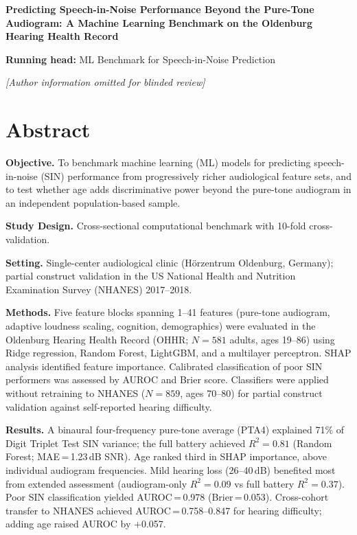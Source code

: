 \documentclass[12pt,a4paper]{article}
\begin{document}
\begin{center}
{\large\textbf{Predicting Speech-in-Noise Performance Beyond the Pure-Tone
Audiogram: A Machine Learning Benchmark on the Oldenburg Hearing Health
Record}}
\end{center}

\medskip
\noindent\textbf{Running head:} ML Benchmark for Speech-in-Noise Prediction

\medskip
\noindent\textit{[Author information omitted for blinded review]}

\section*{Abstract}

\noindent\textbf{Objective.} To benchmark machine learning (ML) models for
predicting speech-in-noise (SIN) performance from progressively richer
audiological feature sets, and to test whether age adds discriminative power
beyond the pure-tone audiogram in an independent population-based sample.

\noindent\textbf{Study Design.} Cross-sectional computational benchmark with
10-fold cross-validation.

\noindent\textbf{Setting.} Single-center audiological clinic (Hörzentrum
Oldenburg, Germany); partial construct validation in the US National Health
and Nutrition Examination Survey (NHANES) 2017--2018.

\noindent\textbf{Methods.} Five feature blocks spanning 1--41 features
(pure-tone audiogram, adaptive loudness scaling, cognition, demographics)
were evaluated in the Oldenburg Hearing Health Record (OHHR; $N=581$ adults,
ages 19--86) using Ridge regression, Random Forest, LightGBM, and a
multilayer perceptron. SHAP analysis identified feature importance. Calibrated
classification of poor SIN performers was assessed by AUROC and Brier score.
Classifiers were applied without retraining to NHANES ($N=859$, ages 70--80)
for partial construct validation against self-reported hearing difficulty.

\noindent\textbf{Results.} A binaural four-frequency pure-tone average (PTA4)
explained 71\% of Digit Triplet Test SIN variance; the full battery achieved
$R^2{=}0.81$ (Random Forest; MAE\,=\,1.23\,dB SNR). Age ranked third in
SHAP importance, above individual audiogram frequencies. Mild hearing loss
(26--40\,dB) benefited most from extended assessment (audiogram-only
$R^2{=}0.09$ vs full battery $R^2{=}0.37$). Poor SIN classification yielded
AUROC\,=\,0.978 (Brier\,=\,0.053). Cross-cohort transfer to NHANES achieved
AUROC\,=\,0.758--0.847 for hearing difficulty; adding age raised AUROC
by $+$0.057.
\end{document}
